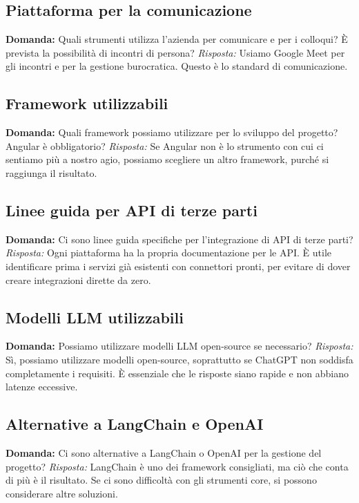 \documentclass{article}
\begin{document}
\subsection{Piattaforma per la comunicazione} \textbf{Domanda:} Quali strumenti utilizza l'azienda per comunicare e per i colloqui? È prevista la possibilità di incontri di persona?
\newline
\textit{Risposta:} Usiamo Google Meet per gli incontri e per la gestione burocratica. Questo è lo standard di comunicazione.

\subsection{Framework utilizzabili} \textbf{Domanda:} Quali framework possiamo utilizzare per lo sviluppo del progetto? Angular è obbligatorio?
\newline
\textit{Risposta:} Se Angular non è lo strumento con cui ci sentiamo più a nostro agio, possiamo scegliere un altro framework, purché si raggiunga il risultato.

\subsection{Linee guida per API di terze parti} \textbf{Domanda:} Ci sono linee guida specifiche per l'integrazione di API di terze parti?
\newline
\textit{Risposta:} Ogni piattaforma ha la propria documentazione per le API. È utile identificare prima i servizi già esistenti con connettori pronti, per evitare di dover creare integrazioni dirette da zero.

\subsection{Modelli LLM utilizzabili} \textbf{Domanda:} Possiamo utilizzare modelli LLM open-source se necessario?
\newline
\textit{Risposta:} Sì, possiamo utilizzare modelli open-source, soprattutto se ChatGPT non soddisfa completamente i requisiti. È essenziale che le risposte siano rapide e non abbiano latenze eccessive.

\subsection{Alternative a LangChain e OpenAI} \textbf{Domanda:} Ci sono alternative a LangChain o OpenAI per la gestione del progetto?
\newline
\textit{Risposta:} LangChain è uno dei framework consigliati, ma ciò che conta di più è il risultato. Se ci sono difficoltà con gli strumenti core, si possono considerare altre soluzioni.
\end{document}
